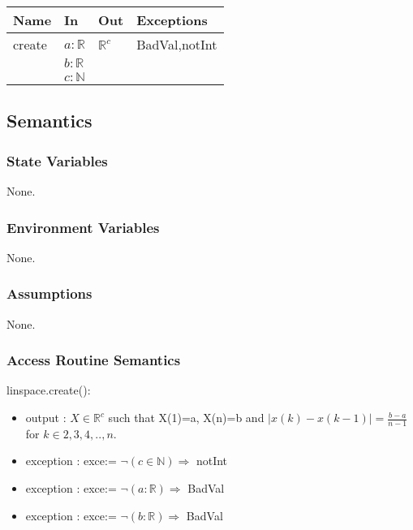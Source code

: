 \documentclass[12pt, titlepage]{article}
\begin{document}
\begin{center}
	\begin{tabular}{p{2cm} p{6cm} p{6cm} p{3cm}}
		\hline
		\textbf{Name} & \textbf{In} & \textbf{Out} & \textbf{Exceptions} \\
		\hline
		create & $a : \mathbb{R}$ & $\mathbb{R}^{c}$ & 
		BadVal,notInt \\ 
		& $b : \mathbb{R}$ &  &  \\  
		& $c : \mathbb{N}$ &  &  \\ 
		\hline
	\end{tabular}
\end{center}

\subsection{Semantics}

\subsubsection{State Variables}

None.

\subsubsection{Environment Variables}

None.

\subsubsection{Assumptions}

None.

\subsubsection{Access Routine Semantics}

\noindent linspace.create():
\begin{itemize}
	\item output : $X \in \mathbb{R}^{c}$ such that X(1)=a, X(n)=b and 
	$|x(k)-x(k-1)|=\frac{b-a}{n-1}$ for $k \in {2,3,4,..,n}$. 
	\item exception : exce:= $\neg(c \in \mathbb{N}) \Rightarrow$ 
	notInt 
	\item exception : exce:= $\neg(a: \mathbb{R}) \Rightarrow$ BadVal 
	\item exception : exce:= $\neg(b: \mathbb{R}) \Rightarrow$ BadVal
\end{itemize}
\end{document}
